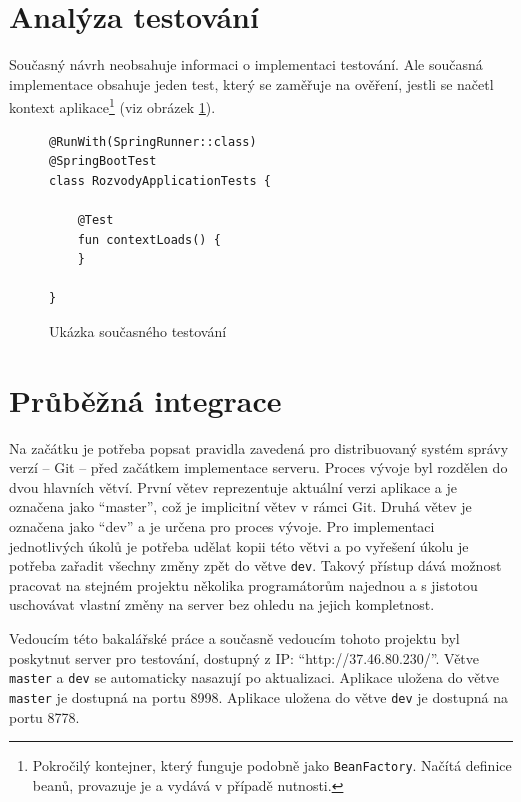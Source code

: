 \section{Analýza testování}\label{analyza:testovani}
    Současný návrh neobsahuje informaci o implementaci testování. Ale současná implementace obsahuje jeden test, který se zaměřuje na ověření, jestli se načetl {kontext aplikace}\footnote{Pokročilý kontejner, který funguje podobně jako \texttt{BeanFactory}. Načítá definice beanů, provazuje je a vydává v případě nutnosti.} (viz obrázek \ref{code:test-context-loads1}).
    \begin{figure}
    \begin{verbatim}
@RunWith(SpringRunner::class)
@SpringBootTest
class RozvodyApplicationTests {

    @Test
    fun contextLoads() {
    }

}
        \end{verbatim}
        \caption{Ukázka současného testování} 
        \label{code:test-context-loads1}
        \end{figure}
        
\section{Průběžná integrace}\label{analyza:ci}
    Na začátku je potřeba popsat pravidla zavedená pro distribuovaný systém správy verzí -- Git -- před začátkem implementace serveru. Proces vývoje byl rozdělen do dvou hlavních větví. První větev reprezentuje aktuální verzi aplikace a je označena jako \enquote{master}, což je implicitní větev v rámci Git. Druhá větev je označena jako \enquote{dev} a je určena pro proces vývoje. Pro implementaci jednotlivých úkolů je potřeba udělat kopii této větvi a po vyřešení úkolu je potřeba zařadit všechny změny zpět do větve \verb|dev|. Takový přístup dává možnost pracovat na stejném projektu několika programátorům najednou a s jistotou uschovávat vlastní změny na server bez ohledu na jejich kompletnost.
    
    Vedoucím této bakalářské práce a současně vedoucím tohoto projektu byl poskytnut server pro testování, dostupný z IP: \enquote{http://37.46.80.230/}. Větve \verb|master| a \verb|dev| se automaticky nasazují po aktualizaci. Aplikace uložena do větve \verb|master| je dostupná na portu 8998. Aplikace uložena do větve \verb|dev| je dostupná na portu 8778.